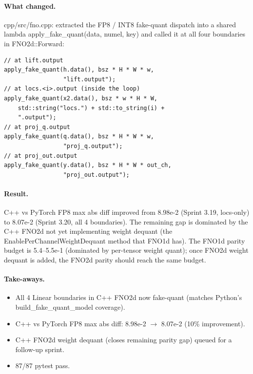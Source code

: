 \documentclass[10pt,twocolumn]{article}
\renewcommand{\texttt}[1]{{\normalfont\ttfamily #1}\normalfont\rmfamily}
\begin{document}
\paragraph{What changed.}
\texttt{cpp/src/fno.cpp}: extracted the FP8 / INT8
fake-quant dispatch into a shared lambda
\texttt{apply\_fake\_quant(data, numel, key)} and
called it at all four boundaries in
\texttt{FNO2d::Forward}:

\begin{verbatim}
// at lift.output
apply_fake_quant(h.data(), bsz * H * W * w,
                 "lift.output");
// at locs.<i>.output (inside the loop)
apply_fake_quant(x2.data(), bsz * w * H * W,
    std::string("locs.") + std::to_string(i) +
    ".output");
// at proj_q.output
apply_fake_quant(q.data(), bsz * H * W * w,
                 "proj_q.output");
// at proj_out.output
apply_fake_quant(y.data(), bsz * H * W * out_ch,
                 "proj_out.output");
\end{verbatim}

\paragraph{Result.}
C++ vs PyTorch FP8 max abs diff improved from
\texttt{8.98e-2} (Sprint 3.19, locs-only) to
\texttt{8.07e-2} (Sprint 3.20, all 4 boundaries).
The remaining gap is dominated by the C++ FNO2d
not yet implementing weight dequant (the
\texttt{EnablePerChannelWeightDequant} method
that FNO1d has).  The FNO1d parity budget is
5.4--5.5e-1 (dominated by per-tensor weight
quant); once FNO2d weight dequant is added, the
FNO2d parity should reach the same budget.

\paragraph{Take-aways.}
\begin{itemize}
\item All 4 Linear boundaries in C++ FNO2d now
fake-quant (matches Python's
\texttt{build\_fake\_quant\_model} coverage).
\item C++ vs PyTorch FP8 max abs diff:
8.98e-2 \texttt{$\to$} 8.07e-2 (10\% improvement).
\item C++ FNO2d weight dequant (closes remaining
parity gap) queued for a follow-up sprint.
\item 87/87 pytest pass.
\end{itemize}

\end{document}
